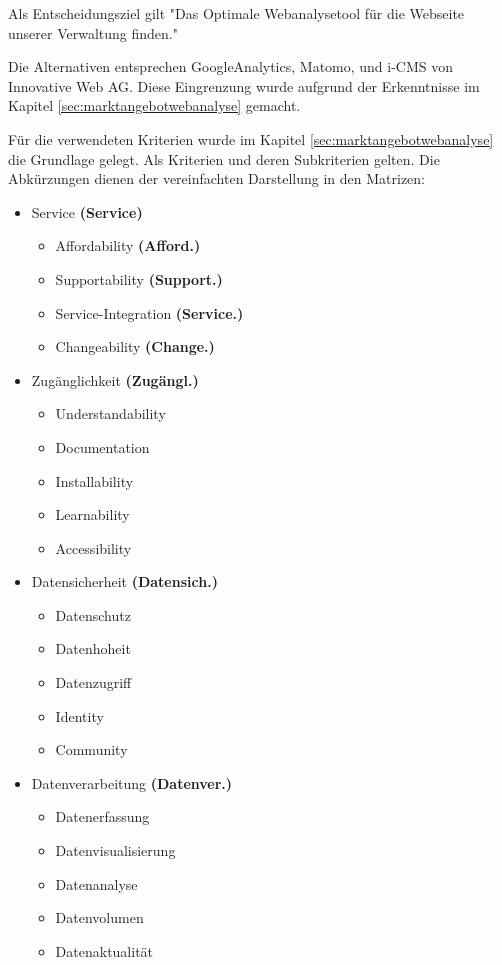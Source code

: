 Als Entscheidungsziel gilt "Das Optimale Webanalysetool für die Webseite unserer Verwaltung finden."

Die Alternativen entsprechen GoogleAnalytics, Matomo, und i-CMS von Innovative Web AG. Diese Eingrenzung wurde aufgrund der Erkenntnisse im Kapitel \ref{sec:marktangebotwebanalyse} gemacht. 

\newpage
Für die verwendeten Kriterien wurde im Kapitel \ref{sec:marktangebotwebanalyse} die Grundlage gelegt. Als Kriterien und deren Subkriterien gelten. Die Abkürzungen dienen der vereinfachten Darstellung in den Matrizen:

\begin{itemize}
  \item Service \textbf{(Service)} \begin{itemize}
    \item Affordability  \textbf{(Afford.)}
    \item Supportability \textbf{(Support.)}
    \item Service-Integration \textbf{(Service.)}
    \item Changeability \textbf{(Change.)}
  \end{itemize}
  \item Zugänglichkeit \textbf{(Zugängl.)} \begin{itemize}
    \item Understandability
    \item Documentation
    \item Installability
    \item Learnability
    \item Accessibility
  \end{itemize}
  \item Datensicherheit \textbf{(Datensich.)} \begin{itemize}
    \item Datenschutz
    \item Datenhoheit
    \item Datenzugriff
    \item Identity
    \item Community
  \end{itemize}
  \item Datenverarbeitung \textbf{(Datenver.)} \begin{itemize}
    \item Datenerfassung
    \item Datenvisualisierung
    \item Datenanalyse
    \item Datenvolumen
    \item Datenaktualität
  \end{itemize}
\end{itemize}
\newpage

